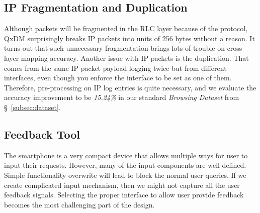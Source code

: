 \subsection{IP Fragmentation and Duplication}
\label{subsec:ip.frag.and.dup}
Although packets will be fragmented in the RLC layer because of the protocol, QxDM surprisingly breaks IP packets into units of 256 bytes without a reason. It turns out that such unnecessary fragmentation brings lots of trouble on cross-layer mapping accuracy. Another issue with IP packets is the duplication. That comes from the same IP packet payload logging twice but from different interfaces, even though you enforce the interface to be set as one of them. Therefore, pre-processing on IP log entries is quite necessary, and we evaluate the accuracy improvement to be \textit{15.24\%} in our standard \emph{Browsing Dataset} from \S~\ref{subsec:dataset}.

\subsection{Feedback Tool}
\label{subsec:challenge.feedback}
The smartphone is a very compact device that allows multiple ways for user to input their requests. However, many of the input components are well defined. Simple functionality overwrite will lead to block the normal user queries. If we create complicated input mechanism, then we might not capture all the user feedback signals. Selecting the proper interface to allow user provide feedback becomes the most challenging part of the design.